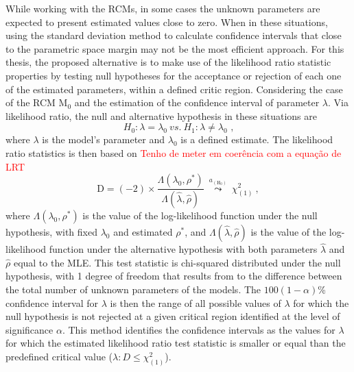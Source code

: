 While working with the RCMs, in some cases the unknown parameters are expected to present estimated values close to zero.
When in these situations, using the standard deviation method to calculate confidence intervals that close to the parametric space margin may not be the most efficient approach.
For this thesis, the proposed alternative is to make use of the likelihood ratio statistic properties by
testing null hypotheses for the acceptance or rejection of each one of the estimated parameters, within a defined critic region.
Considering the case of the RCM M$_0$ and the estimation of the confidence interval of parameter $\lambda$.
Via likelihood ratio, the null and alternative hypothesis in these situations are
%
$$H_0:\lambda=\lambda_0\ \textit{vs.}\ H_1:\lambda \neq \lambda_0\text{\ ,}$$
%
where $\lambda$ is the model's parameter and $\lambda_0$ is a defined estimate.
The likelihood ratio statistics is then based on
%
\textcolor{red}{Tenho de meter em coerência com a equação de LRT}
\begin{equation}
    \text{D}=(-2)\times \frac{\Lambda{(\lambda_0,\rho^*)}} {\Lambda{(\hat{\lambda},\hat{\rho})}}\ \overset{a_{\left(\text{H}_0\right)}}{\leadsto}\    \chi_{(1)}^{2}\ ,
\end{equation}
%
\noindent
where $\Lambda{(\lambda_0,\rho^*)}$ is the value of the log-likelihood function under the null hypothesis, with fixed $\lambda_0$ and estimated $\rho^*$, and $\Lambda{(\hat{\lambda},\hat{\rho})}$ is the value of the log-likelihood function under the alternative hypothesis with both parameters $\hat{\lambda}$ and $\hat{\rho}$ equal to the MLE.
This test statistic is chi-squared distributed under the null hypothesis, with 1 degree of freedom that results from to the difference between the total number of unknown parameters of the models.
The $100(1-\alpha)$\% confidence interval for $\lambda$ is then the range of all possible values of $\lambda$ for which the null hypothesis is not rejected at a given critical region
identified at the level of significance $\alpha$.
This method identifies the confidence intervals as the values for $\lambda$ for which the estimated likelihood ratio test statistic is smaller or equal than the predefined critical value ($\lambda: D\leq \chi^2_{(1)}$).
